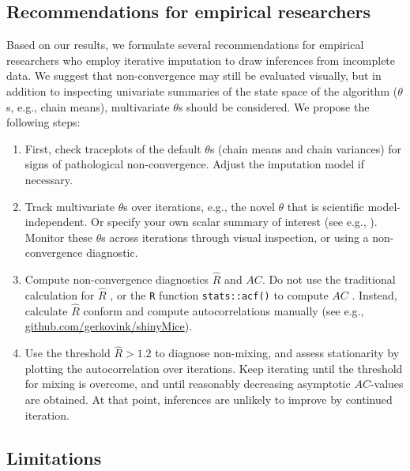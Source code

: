 \documentclass[Royal,times,sageh]{sagej}
\begin{document}
\hypertarget{recommendations-for-empirical-researchers}{%
\subsection{Recommendations for empirical researchers}\label{recommendations-for-empirical-researchers}}

Based on our results, we formulate several recommendations for empirical researchers who employ iterative imputation to draw inferences from incomplete data. We suggest that non-convergence may still be evaluated visually, but in addition to inspecting univariate summaries of the state space of the algorithm (\(\theta\)s, e.g., chain means), multivariate \(\theta\)s should be considered. We propose the following steps:

\begin{enumerate}
\def\labelenumi{\arabic{enumi}.}
\item
  First, check traceplots of the default \(\theta\)s (chain means and chain variances) for signs of pathological non-convergence. Adjust the imputation model if necessary.
\item
  Track multivariate \(\theta\)s over iterations, e.g., the novel \(\theta\) that is scientific model-independent. Or specify your own scalar summary of interest (see e.g., \citet{buur18}). Monitor these \(\theta\)s across iterations through visual inspection, or using a non-convergence diagnostic.
\item
  Compute non-convergence diagnostics \(\widehat{R}\) and \(AC\). Do not use the traditional calculation for \(\widehat{R}\) \citep{gelm92}, or the \texttt{R} function \texttt{stats::acf()} to compute \(AC\) \citep{R}. Instead, calculate \(\widehat{R}\) conform \citet{veht19} and compute autocorrelations manually (see e.g., \href{https://github.com/gerkovink/shinyMice/tree/master/3.Thesis/1.SimulationStudy}{github.com/gerkovink/shinyMice}).
\item
  Use the threshold \(\widehat{R}>1.2\) to diagnose non-mixing, and assess stationarity by plotting the autocorrelation over iterations. Keep iterating until the threshold for mixing is overcome, and until reasonably decreasing asymptotic \(AC\)-values are obtained. At that point, inferences are unlikely to improve by continued iteration.
\end{enumerate}

\hypertarget{limitations}{%
\subsection{Limitations}\label{limitations}}
\end{document}

